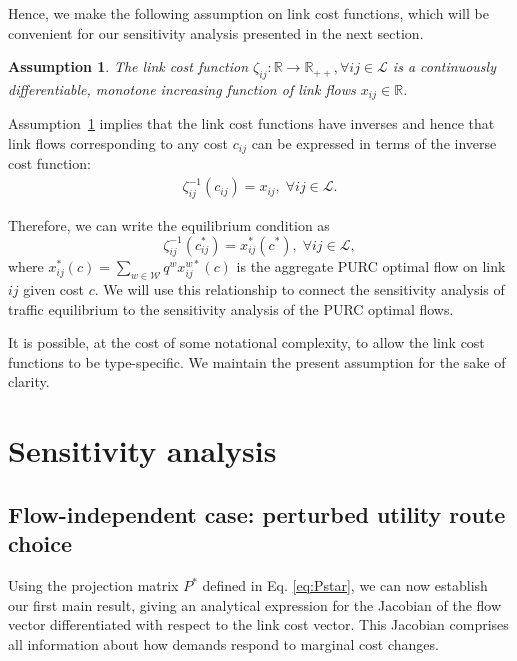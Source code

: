 \documentclass[a4paper,11pt]{article}
\newtheorem{assumption}{Assumption}
\begin{document}
Hence, we make the following assumption on link cost functions, which will be convenient for our sensitivity analysis presented in the next section.

\begin{assumption}\label{A:3}
    The link cost function $\zeta_{ij}:\mathbb{R} \rightarrow \mathbb{R}_{++}, \forall {ij} \in \mathcal{L}$ is a continuously differentiable,  monotone increasing function of link flows $x_{ij} \in \mathbb{R}$.
\end{assumption}

Assumption~\ref{A:3} implies that the link cost functions have inverses and hence that link flows corresponding to any cost $c_{ij}$ can be expressed in terms of the inverse cost function:
\begin{align}
    \zeta_{ij}^{-1}(c_{ij}) = x_{ij}, \; \forall {ij} \in \mathcal{L}.
\end{align}

Therefore, we can write the equilibrium condition as 
\begin{equation}\label{eq:prop_dual_fixed_point}
        \zeta_{ij}^{-1}(c^*_{ij}) = x^*_{ij}(c^*), \; \forall ij \in \mathcal{L},
    \end{equation}
where $x^*_{ij}(c) = \sum_{w\in\mathcal{W}} q^w x_{ij}^{w*}(c)$ is the aggregate PURC optimal flow on link $ij$ given cost $c$. We will use this relationship to connect the sensitivity analysis of traffic equilibrium to the sensitivity analysis of the PURC optimal flows.

It is possible, at the cost of some notational complexity, to allow the link cost functions to be type-specific. We maintain the present assumption for the sake of clarity. 


\section{Sensitivity analysis}\label{sec:theoretical_results}

\subsection{Flow-independent case: perturbed utility route choice}\label{sec:main_result}
Using the projection matrix $ P^*$ defined in Eq. \eqref{eq:Pstar}, we can now establish our first main result, giving an analytical expression for the Jacobian of the flow vector differentiated with respect to the link cost vector. This Jacobian comprises all information about how demands respond to marginal cost changes.
\end{document}
